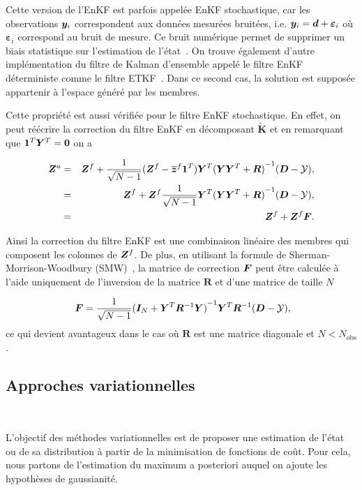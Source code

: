Cette version de l'EnKF est parfois appelée EnKF stochastique, car les observations $\bm{y}_i$ correspondent aux données mesurées bruitées, i.e. $\bm{y}_i = \bm{d} + \bm \varepsilon_i$ où $\bm \varepsilon_i$ correspond au bruit de mesure. Ce bruit numérique permet de supprimer un biais statistique sur l'estimation de l'état~\cite{van_leeuwen_consistent_2020}. On trouve également d'autre implémentation du filtre de Kalman d'ensemble appelé le filtre EnKF déterministe comme le filtre ETKF~\cite{bishop_adaptive_2001, Hunt2007}. Dans ce second cas, la solution est supposée appartenir à l'espace généré par les membres.

Cette propriété est aussi vérifiée pour le filtre EnKF stochastique. En effet, on peut réécrire la correction du filtre EnKF en décomposant $\tilde{\bm{K}}$ et en remarquant que $\bm 1^T \bm Y^T = \bm 0$ on a

\begin{eqnarray*}
    \bm{Z}^a &=& \bm{Z}^f + \frac{1}{\sqrt{N - 1}}(\bm Z^f - \overline{\bm{z}}^f \bm{1}^T)\bm Y^T {(\bm Y \bm Y^T + \bm R)}^{-1} ( \bm{D} - \mathcal{Y}), \\
    &=& \bm{Z}^f +\bm Z^f  \frac{1}{\sqrt{N - 1}}\bm Y^T {(\bm Y \bm Y^T + \bm R)}^{-1} ( \bm{D} - \mathcal{Y}), \\
    &=& \bm{Z}^f +\bm Z^f \bm{F}.
\end{eqnarray*}

Ainsi la correction du filtre EnKF est une combinaison linéaire des membres qui composent les colonnes de $\bm{Z}^f$. De plus, en utilisant la formule de Sherman-Morrison-Woodbury (SMW)~\cite{SMW}, la matrice de correction $\bm{F}$ peut être calculée à l'aide uniquement de l'inversion de la matrice $\bm R$ et d'une matrice de taille $N$

\begin{eqnarray}~\label{eq:corr}
    \bm{F} = \frac{1}{\sqrt{N - 1}} {(\bm I_N + \bm Y^T\bm R^{-1}\bm Y)}^{-1}\bm Y^T \bm R^{-1} (\bm{D} - \mathcal{Y}),
\end{eqnarray}ce qui devient avantageux dans le cas où $\bm R$ est une matrice diagonale et $N < N_{\text{obs}}$.

\subsection{Approches variationnelles}~\label{sec:variation}

L'objectif des méthodes variationnelles est de proposer une estimation de l'état ou de sa distribution à partir de la minimisation de fonctions de coût. Pour cela, nous partons de l'estimation du maximum a posteriori auquel on ajoute les hypothèses de gaussianité.

